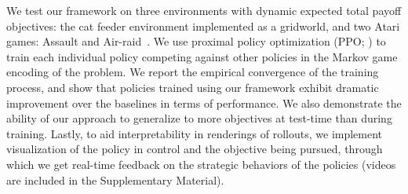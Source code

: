 
We test our framework on three environments with dynamic expected total payoff objectives: the cat feeder environment implemented as a gridworld, and two Atari games: Assault and Air-raid~\citep{bellemare13arcade}.
We use proximal policy optimization (PPO; \cite{schulman2017ppo}) to train each individual policy competing against other policies in the Markov game encoding of the problem.
We report the empirical convergence of the training process, and show that policies trained using our framework exhibit dramatic improvement over the baselines in terms of performance.
We also demonstrate the ability of our approach to generalize to more objectives at test-time than during training.
Lastly, to aid interpretability in renderings of rollouts, we implement visualization of the policy in control and the objective being pursued, through which we get real-time feedback on the strategic behaviors of the policies (videos are included in the Supplementary Material).

